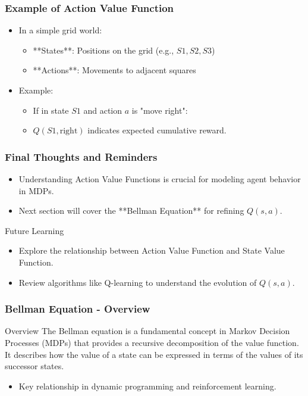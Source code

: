 \documentclass[aspectratio=169]{beamer}
\begin{document}
\begin{frame}[fragile]
    \frametitle{Example of Action Value Function}
    \begin{itemize}
        \item In a simple grid world:
        \begin{itemize}
            \item **States**: Positions on the grid (e.g., \( S1, S2, S3 \))
            \item **Actions**: Movements to adjacent squares
        \end{itemize}
        \item Example:
        \begin{itemize}
            \item If in state \( S1 \) and action \( a \) is "move right":
            \item \( Q(S1, \text{right}) \) indicates expected cumulative reward.
        \end{itemize}
    \end{itemize}
\end{frame}

\begin{frame}[fragile]
    \frametitle{Final Thoughts and Reminders}
    \begin{itemize}
        \item Understanding Action Value Functions is crucial for modeling agent behavior in MDPs.
        \item Next section will cover the **Bellman Equation** for refining \( Q(s, a) \).
    \end{itemize}
    \begin{block}{Future Learning}
        \begin{itemize}
            \item Explore the relationship between Action Value Function and State Value Function.
            \item Review algorithms like Q-learning to understand the evolution of \( Q(s, a) \).
        \end{itemize}
    \end{block}
\end{frame}

\begin{frame}[fragile]
  \frametitle{Bellman Equation - Overview}
  \begin{block}{Overview}
    The Bellman equation is a fundamental concept in Markov Decision Processes (MDPs) that provides a recursive decomposition of the value function. It describes how the value of a state can be expressed in terms of the values of its successor states.
  \end{block}
  
  \begin{itemize}
    \item Key relationship in dynamic programming and reinforcement learning.
  \end{itemize}
\end{frame}
\end{document}
